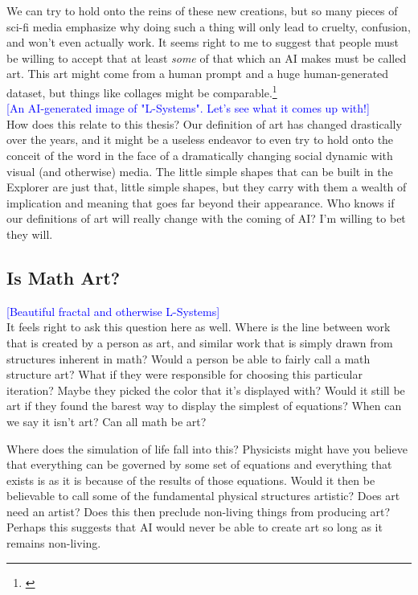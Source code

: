 \documentclass[12pt,twoside]{reedthesis}
\begin{document}
	We can try to hold onto the reins of these new creations, but so many pieces of sci-fi media emphasize why doing such a thing will only lead to cruelty, confusion, and won't even actually work. It seems right to me to suggest that people must be willing to accept that at least \textit{some} of that which an AI makes must be called art. This art might come from a human prompt and a huge human-generated dataset, but things like collages might be comparable.\footnote{\cite{NYT2023}}\\
	
	\textcolor{blue}{[An AI-generated image of "L-Systems". Let's see what it comes up with!]}\\
	
	How does this relate to this thesis? Our definition of art has changed drastically over the years, and it might be a useless endeavor to even try to hold onto the conceit of the word in the face of a dramatically changing social dynamic with visual (and otherwise) media. The little simple shapes that can be built in the Explorer are just that, little simple shapes, but they carry with them a wealth of implication and meaning that goes far beyond their appearance. Who knows if our definitions of art will really change with the coming of AI? I'm willing to bet they will.

\subsection{Is Math Art?}

	\textcolor{blue}{[Beautiful fractal and otherwise L-Systems]}\\

	It feels right to ask this question here as well. Where is the line between work that is created by a person as art, and similar work that is simply drawn from structures inherent in math? Would a person be able to fairly call a math structure art? What if they were responsible for choosing this particular iteration? Maybe they picked the color that it's displayed with? Would it still be art if they found the barest way to display the simplest of equations? When can we say it isn't art? Can all math be art?
	
	Where does the simulation of life fall into this? Physicists might have you believe that everything can be governed by some set of equations and everything that exists is as it is because of the results of those equations. Would it then be believable to call some of the fundamental physical structures artistic? Does art need an artist? Does this then preclude non-living things from producing art? Perhaps this suggests that AI would never be able to create art so long as it remains non-living.\\
	
\end{document}
